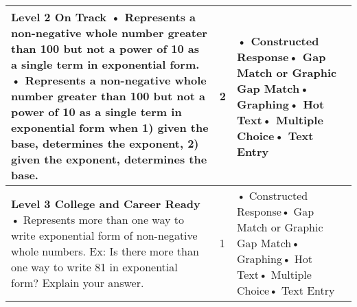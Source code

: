 \documentclass[11pt, English]{article}
\begin{document}
\begin{longtable}{|p{11.0cm}|p{1.8cm}|p{3.7cm}|}
\textbf{Level 2 On Track}\newline
• Represents a non-negative whole number greater than 100 but not a power of 10 as a single term in exponential form. \newline• Represents a non-negative whole number greater than 100 but not a power of 10 as a single term in exponential form when 1) given the base, determines the exponent, 2) given the exponent, determines the base.\newline

 & \hfil{2}
 &• Constructed Response\newline• Gap Match or Graphic Gap Match\newline• Graphing\newline• Hot Text\newline• Multiple Choice\newline• Text Entry\\
\hline


 
\textbf{Level 3 College and Career Ready}\newline
• Represents more than one way to write exponential form of non-negative whole numbers. Ex: Is there more than one way to write 81 in exponential form? Explain your answer. \newline

& \hfil{1}
&• Constructed Response\newline• Gap Match or Graphic Gap Match\newline• Graphing\newline• Hot Text\newline• Multiple Choice\newline• Text Entry\\
\hline 


\end{longtable}
\end{document}
